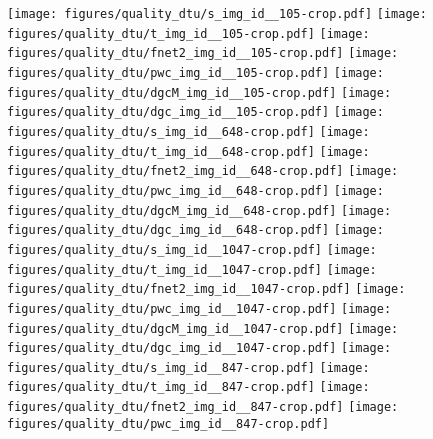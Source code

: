 \documentclass[10pt,twocolumn,letterpaper]{article}
\begin{document}
\begin{figure*}[t!]
	\centering
    \texttt{[image: figures/quality\_dtu/s\_img\_id\_\_105-crop.pdf]}
    \texttt{[image: figures/quality\_dtu/t\_img\_id\_\_105-crop.pdf]}
    \texttt{[image: figures/quality\_dtu/fnet2\_img\_id\_\_105-crop.pdf]}
    \texttt{[image: figures/quality\_dtu/pwc\_img\_id\_\_105-crop.pdf]}
    \texttt{[image: figures/quality\_dtu/dgcM\_img\_id\_\_105-crop.pdf]}
    \texttt{[image: figures/quality\_dtu/dgc\_img\_id\_\_105-crop.pdf]}
\vspace{0.3mm}
    \texttt{[image: figures/quality\_dtu/s\_img\_id\_\_648-crop.pdf]}
    \texttt{[image: figures/quality\_dtu/t\_img\_id\_\_648-crop.pdf]}
    \texttt{[image: figures/quality\_dtu/fnet2\_img\_id\_\_648-crop.pdf]}
    \texttt{[image: figures/quality\_dtu/pwc\_img\_id\_\_648-crop.pdf]}
    \texttt{[image: figures/quality\_dtu/dgcM\_img\_id\_\_648-crop.pdf]}
    \texttt{[image: figures/quality\_dtu/dgc\_img\_id\_\_648-crop.pdf]}
    \vspace{0.3mm}
    \texttt{[image: figures/quality\_dtu/s\_img\_id\_\_1047-crop.pdf]}
    \texttt{[image: figures/quality\_dtu/t\_img\_id\_\_1047-crop.pdf]}
    \texttt{[image: figures/quality\_dtu/fnet2\_img\_id\_\_1047-crop.pdf]}
    \texttt{[image: figures/quality\_dtu/pwc\_img\_id\_\_1047-crop.pdf]}
    \texttt{[image: figures/quality\_dtu/dgcM\_img\_id\_\_1047-crop.pdf]}
    \texttt{[image: figures/quality\_dtu/dgc\_img\_id\_\_1047-crop.pdf]}
    \vspace{0.3mm}
    \texttt{[image: figures/quality\_dtu/s\_img\_id\_\_847-crop.pdf]}
    \texttt{[image: figures/quality\_dtu/t\_img\_id\_\_847-crop.pdf]}
    \texttt{[image: figures/quality\_dtu/fnet2\_img\_id\_\_847-crop.pdf]}
    \texttt{[image: figures/quality\_dtu/pwc\_img\_id\_\_847-crop.pdf]}

\end{figure*}
\end{document}
